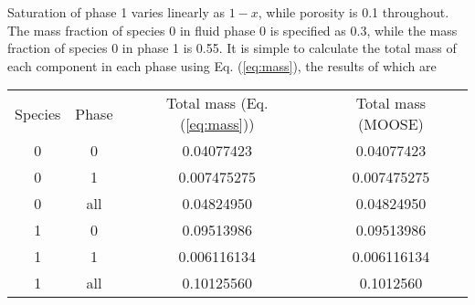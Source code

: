 Saturation of phase 1 varies linearly as $1 - x$, while porosity is 0.1 throughout. The mass fraction of species 0 in fluid phase 0 is specified as 0.3, while the mass fraction of species 0 in phase 1 is 0.55. It is simple to calculate the total mass of each component in each phase using Eq. (\ref{eq:mass}), the results of which are

\begin{center}
\begin{tabular}{|cccc|}
\hline
Species & Phase & Total mass (Eq. (\ref{eq:mass})) & Total mass (MOOSE) \\
0 & 0 & 0.04077423 & 0.04077423 \\
0 & 1 & 0.007475275 & 0.007475275 \\
0 & all & 0.04824950 &  0.04824950\\
1 & 0 & 0.09513986 & 0.09513986\\
1 & 1 & 0.006116134 & 0.006116134\\
1 & all & 0.10125560 & 0.1012560\\
\hline
\end{tabular}
\end{center}
